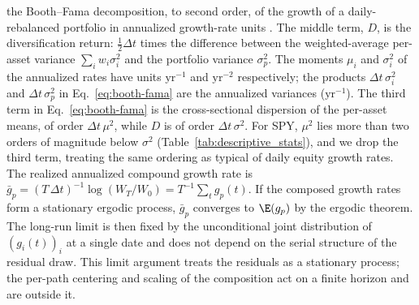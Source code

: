 the Booth--Fama decomposition, to second order, of the growth of a
daily-rebalanced portfolio in annualized growth-rate units
\cite{boothFama1992, markowitz1976longRun}. The middle term, $D$, is
the diversification return: $\tfrac{1}{2}\Delta t$ times the
difference between the weighted-average per-asset variance
$\sum_i w_i \sigma_i^2$ and the portfolio variance $\sigma_p^2$. The
moments $\mu_i$ and $\sigma_i^2$ of the annualized rates
have units $\mathrm{yr}^{-1}$ and $\mathrm{yr}^{-2}$ respectively;
the products $\Delta t\,\sigma_i^2$ and $\Delta t\,\sigma_p^2$ in
Eq.~\eqref{eq:booth-fama} are the annualized variances
($\mathrm{yr}^{-1}$). The third term in Eq.~\eqref{eq:booth-fama} is
the cross-sectional dispersion of the per-asset means, of order
$\Delta t\,\mu^2$, while $D$ is of order $\Delta t\,\sigma^2$. For
SPY, $\mu^2$ lies more than two orders of magnitude below $\sigma^2$
(Table~\ref{tab:descriptive_stats}), and we drop the third term,
treating the same ordering as typical of daily equity growth rates.
The realized annualized compound growth rate is
$\bar g_p = (T\,\Delta t)^{-1}\log(W_T/W_0) = T^{-1}\sum_{t} g_p(t)$.
If the composed growth rates form a stationary ergodic process,
$\bar g_p$ converges to $\E(g_p)$ by the ergodic theorem. The long-run
limit is then fixed by the unconditional joint distribution of
$(g_i(t))_i$ at a single date and does not depend on the serial
structure of the residual draw. This limit argument treats the
residuals as a stationary process; the per-path centering and scaling
of the composition act on a finite horizon and are outside it.

